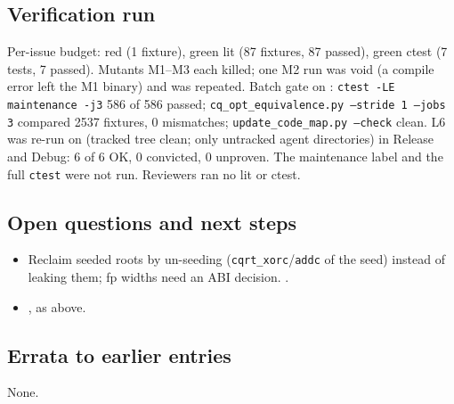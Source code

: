 \subsection*{Verification run}
Per-issue budget: red (1 fixture), green lit (87 fixtures, 87 passed), green
ctest (7 tests, 7 passed). Mutants M1--M3 each killed; one M2 run was void (a
compile error left the M1 binary) and was repeated. Batch gate on : \texttt{ctest -LE maintenance -j3}
586 of 586 passed; \texttt{cq\_opt\_equivalence.py --stride 1 --jobs 3}
compared 2537 fixtures, 0 mismatches; \texttt{update\_code\_map.py --check}
clean. L6 was re-run on  (tracked tree clean; only
untracked agent directories) in Release and Debug: 6 of 6 OK, 0 convicted,
0 unproven. The maintenance label and the full \texttt{ctest} were not run.
Reviewers ran no lit or ctest.

\subsection*{Open questions and next steps}
\begin{itemize}
  \item Reclaim seeded roots by un-seeding (\texttt{cqrt\_xorc}/\texttt{addc} of
  the seed) instead of leaking them; fp widths need an ABI decision.
  .
  \item {},  as above.
\end{itemize}

\subsection*{Errata to earlier entries}
None.
